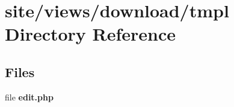 \section{site/views/download/tmpl Directory Reference}
\label{dir_420b99ba2757744a6775e0c2595b4904}
\subsection*{Files}
\begin{DoxyCompactItemize}
\item 
file \textbf{ edit.\+php}
\end{DoxyCompactItemize}

